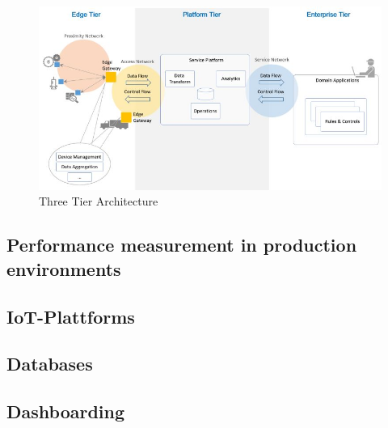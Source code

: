 \begin{figure}[H]
	\includegraphics[width=\linewidth]{pic/three-tier-architecture.jpg}
	\caption{Three Tier Architecture}
	\label{fig:Three-Tier-Architecture}
\end{figure}
\subsection{Performance measurement in production environments}
\subsection{IoT-Plattforms}

\subsection{Databases}
\subsection{Dashboarding}


